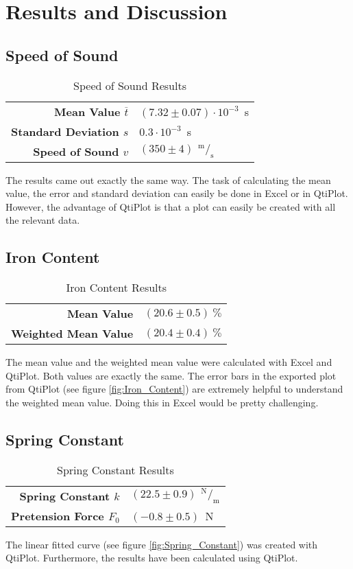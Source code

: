 \section{Results and Discussion}
\label{sec:Results_and_Discussion}
\subsection{Speed of Sound}
\begin{table}[H]
	\centering
	\renewcommand{\arraystretch}{1.2}
	\begin{tabular}{r l}
		\hline
		\textbf{Mean Value $\overline t$} & $(7.32\pm0.07)\cdot10^{-3}$\ s \\
		\textbf{Standard Deviation $s$} & $0.3\cdot10^{-3}$\ s \\
		\textbf{Speed of Sound $v$} & $(350\pm4)\ \,^\text{m}\!/_\text{s}$ \\ \hline
	\end{tabular}
	\caption{Speed of Sound Results}
	\label{tab:Speed_of_Sound_Results}
\end{table}
The results came out exactly the same way. The task of calculating the mean value, the error and standard deviation can easily be done in Excel or in QtiPlot. However, the advantage of QtiPlot is that a plot can easily be created with all the relevant data.
\subsection{Iron Content}
\begin{table}[H]
	\centering
	\renewcommand{\arraystretch}{1.2}
	\begin{tabular}{r c}
		\hline
		\textbf{Mean Value} & $(20.6\pm0.5)\ \%$ \\
		\textbf{Weighted Mean Value} & $(20.4\pm0.4)\ \%$ \\ \hline
	\end{tabular}
	\caption{Iron Content Results}
	\label{tab:Iron_Content_Results}
\end{table}
The mean value and the weighted mean value were calculated with Excel and QtiPlot. Both values are exactly the same. The error bars in the exported plot from QtiPlot (see figure \ref{fig:Iron_Content}) are extremely helpful to understand the weighted mean value. Doing this in Excel would be pretty challenging.
\subsection{Spring Constant}
\begin{table}[H]
	\centering
	\renewcommand{\arraystretch}{1.2}
	\begin{tabular}{r l}
		\hline
		\textbf{Spring Constant $k$} & $(22.5\pm0.9)\ \,^\text{N}\!/_\text{m}$ \\
		\textbf{Pretension Force $F_0$} & $(-0.8\pm0.5)$\ N \\ \hline
	\end{tabular}
	\caption{Spring Constant Results}
	\label{tab:Spring_Constant_Results}
\end{table}
The linear fitted curve (see figure \ref{fig:Spring_Constant}) was created with QtiPlot. Furthermore, the results have been calculated using QtiPlot.
\newpage
